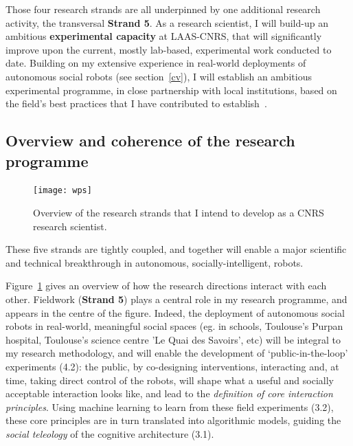 Those four research strands are all underpinned by one additional research
activity, the transversal {\bf Strand 5}. As a research scientist, I will
build-up an ambitious \textbf{experimental capacity} at LAAS-CNRS, that will
significantly improve upon the current, mostly lab-based, experimental work
conducted to date. Building on my extensive experience in real-world deployments
of autonomous social robots (see section~\ref{cv}), I will establish an
ambitious experimental programme, in close partnership with local institutions,
based on the field's best practices that I have contributed to
establish~\parencite{baxter2016characterising}.



\subsection{Overview and coherence of the research programme}

\begin{figure}[h!]
\centering
\texttt{[image: wps]}
\caption{Overview of the research strands that I intend to develop as a CNRS
    research scientist.}
\label{fig:wps}
\end{figure}

These five strands are tightly coupled, and together will enable a major
scientific and technical breakthrough in autonomous, socially-intelligent,
robots.

Figure~\ref{fig:wps} gives an overview of how the research directions interact
with each other. Fieldwork (\textbf{Strand 5}) plays a central role in my research programme, and
appears in the centre of the figure. Indeed, the deployment of autonomous social
robots in real-world, meaningful social spaces (eg. in schools, Toulouse's
Purpan hospital, Toulouse's science centre 'Le Quai des Savoirs', etc) will be
integral to my research methodology, and will enable the development of
`public-in-the-loop' experiments (4.2): the public, by co-designing interventions,
interacting and, at time, taking direct control of the robots, will shape what a
useful and socially acceptable interaction looks like, and lead to the
\emph{definition of core interaction principles}. Using machine learning to learn from
these field experiments (3.2), these core principles are in turn translated into
algorithmic models, guiding the \emph{social teleology} of the cognitive architecture
(3.1).


